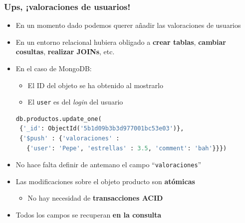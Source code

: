 \documentclass[14pt]{beamer}
\begin{document}
\begin{frame}
  \frametitle{Ups, ¡valoraciones de usuarios!}
\begin{itemize}
\item En un momento dado podemos querer añadir las valoraciones de usuarios
\item En un entorno relacional hubiera obligado a {\bf crear tablas}, {\bf
    cambiar cosultas}, {\bf realizar JOINs}, etc.
\item En el caso de MongoDB:
  \begin{itemize}
  \item El ID del objeto se ha obtenido al mostrarlo
  \item El {\tt user} es del {\em login\/} del usuario
  \end{itemize}

\begin{lstlisting}[language=python]
db.productos.update_one(
 {'_id': ObjectId('5b1d09b3b3d977001bc53e03')},
 {'$push' : {'valoraciones' :
   {'user': 'Pepe', 'estrellas' : 3.5, 'comment': 'bah'}}})
\end{lstlisting}

\framebreak


\item No hace falta definir de antemano el campo ``{\tt valoraciones}''
\item Las modificaciones sobre el objeto producto son {\bf atómicas}
  \begin{itemize}
  \item No hay necesidad de {\bf transacciones ACID}
  \end{itemize}
\item Todos los campos se recuperan {\bf en la consulta}
\end{itemize}
\end{frame}

\end{document}
